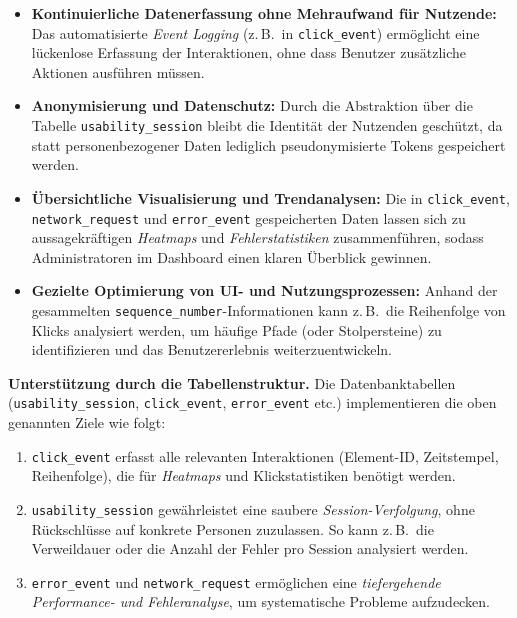 \documentclass[12pt,oneside]{article}
\begin{document}
\begin{itemize}
    \item \textbf{Kontinuierliche Datenerfassung ohne Mehraufwand für Nutzende:} 
    Das automatisierte \emph{Event Logging} (z.\,B.\ in \texttt{click\_event}) ermöglicht eine lückenlose Erfassung der Interaktionen, ohne dass Benutzer zusätzliche Aktionen ausführen müssen.
    \item \textbf{Anonymisierung und Datenschutz:} 
    Durch die Abstraktion über die Tabelle \texttt{usability\_session} bleibt die Identität der Nutzenden geschützt, da statt personenbezogener Daten lediglich pseudonymisierte Tokens gespeichert werden.
    \item \textbf{Übersichtliche Visualisierung und Trendanalysen:} 
    Die in \texttt{click\_event}, \texttt{network\_request} und \texttt{error\_event} gespeicherten Daten lassen sich zu aussagekräftigen \emph{Heatmaps} und \emph{Fehlerstatistiken} zusammenführen, sodass Administratoren im Dashboard einen klaren Überblick gewinnen.
    \item \textbf{Gezielte Optimierung von UI- und Nutzungsprozessen:} 
    Anhand der gesammelten \texttt{sequence\_number}-Informationen kann z.\,B.\ die Reihenfolge von Klicks analysiert werden, um häufige Pfade (oder Stolpersteine) zu identifizieren und das Benutzererlebnis weiterzuentwickeln.
\end{itemize}

\noindent
\textbf{Unterstützung durch die Tabellenstruktur.} Die Datenbanktabellen (\texttt{usability\_session}, \texttt{click\_event}, \texttt{error\_event} etc.) implementieren die oben genannten Ziele wie folgt:
\begin{enumerate}
    \item \texttt{click\_event} erfasst alle relevanten Interaktionen (Element-ID, Zeitstempel, Reihenfolge), die für \emph{Heatmaps} und Klickstatistiken benötigt werden.
    \item \texttt{usability\_session} gewährleistet eine saubere \emph{Session-Verfolgung}, ohne Rückschlüsse auf konkrete Personen zuzulassen. So kann z.\,B.\ die Verweildauer oder die Anzahl der Fehler pro Session analysiert werden.
    \item \texttt{error\_event} und \texttt{network\_request} ermöglichen eine \emph{tiefergehende Performance- und Fehleranalyse}, um systematische Probleme aufzudecken.
\end{enumerate}
\end{document}
